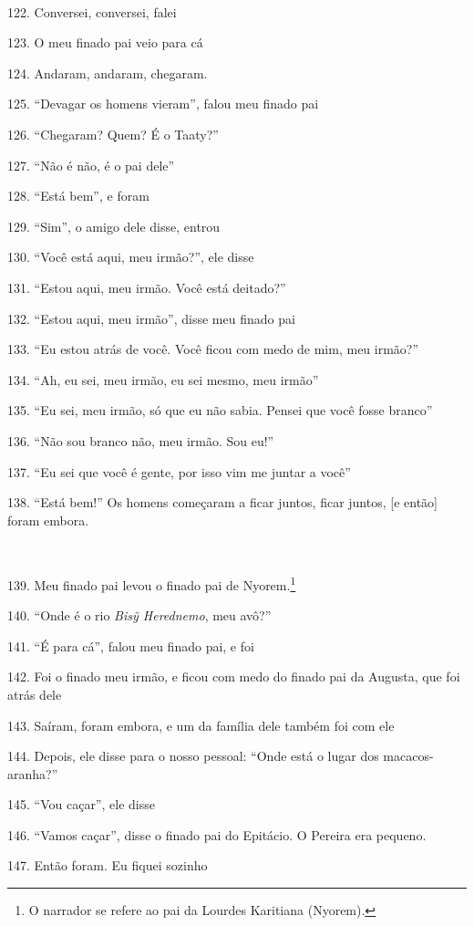 ~

122. Conversei, conversei, falei

123. O meu finado pai veio para cá

124. Andaram, andaram, chegaram.

125. ``Devagar os homens vieram'', falou meu finado pai

126. ``Chegaram? Quem? É o Taaty?''

127. ``Não é não, é o pai dele''

128. ``Está bem'', e foram

129. ``Sim'', o amigo dele disse, entrou

130. ``Você está aqui, meu irmão?'', ele disse

131. ``Estou aqui, meu irmão. Você está deitado?''

132. ``Estou aqui, meu irmão'', disse meu finado pai

133. ``Eu estou atrás de você. Você ficou com medo de mim, meu irmão?''

134. ``Ah, eu sei, meu irmão, eu sei mesmo, meu irmão''

135. ``Eu sei, meu irmão, só que eu não sabia. Pensei que você fosse branco''

136. ``Não sou branco não, meu irmão. Sou eu!''

137. ``Eu sei que você é gente, por isso vim me juntar a você''

138. ``Está bem!'' Os homens começaram a ficar juntos, ficar juntos, {[}e então{]} foram embora.

~

139. Meu finado pai levou o finado pai de Nyorem.\footnote{O narrador se
  refere ao pai da Lourdes Karitiana (Nyorem).}

140. ``Onde é o rio \emph{Bisỹ Herednemo}, meu avô?''

141. ``É para cá'', falou meu finado pai, e foi

142. Foi o finado meu irmão, e ficou com medo do finado pai da Augusta,
que foi atrás dele

143. Saíram, foram embora, e um da família dele também foi com ele

144. Depois, ele disse para o nosso pessoal: ``Onde está o lugar dos
macacos- aranha?''

145. ``Vou caçar'', ele disse

146. ``Vamos caçar'', disse o finado pai do Epitácio. O Pereira era pequeno.

147. Então foram. Eu fiquei sozinho

